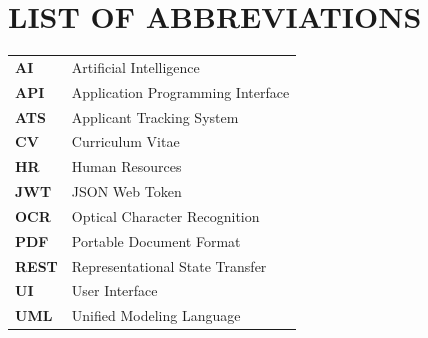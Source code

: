 ﻿\titlespacing*{\chapter}{0pt}{-2cm}{30pt}
\chapter*{LIST OF ABBREVIATIONS}
\titlespacing*{\chapter}{0pt}{0pt}{50pt}
\adjustmtc
\thispagestyle{MyStyle}

\vspace{1cm}

\begin{tabularx}{\textwidth}{@{}>{\bfseries}l X@{}}
AI      & Artificial Intelligence \\[0.5em]
API     & Application Programming Interface \\[0.5em]
ATS     & Applicant Tracking System \\[0.5em]
CV      & Curriculum Vitae \\[0.5em]
HR      & Human Resources \\[0.5em]
JWT     & JSON Web Token \\[0.5em]
OCR     & Optical Character Recognition \\[0.5em]
PDF     & Portable Document Format \\[0.5em]
REST    & Representational State Transfer \\[0.5em]
UI      & User Interface \\[0.5em]
UML     & Unified Modeling Language \\
\end{tabularx}

